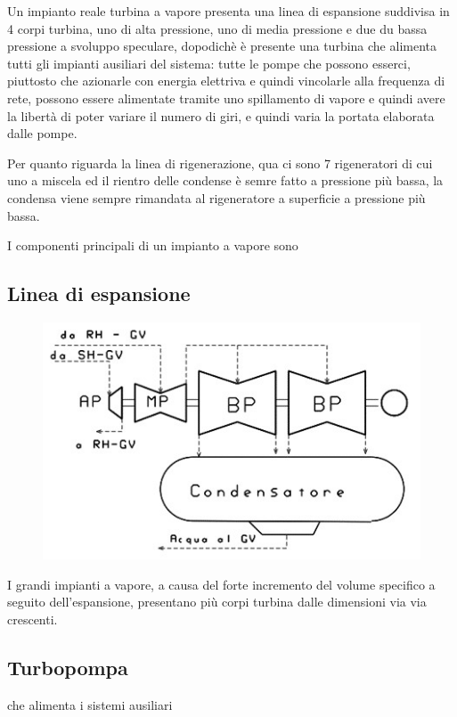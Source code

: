 \begin{adjustwidth}{2in}{}
	Un impianto reale turbina a vapore presenta una linea di espansione suddivisa in 4 corpi turbina, uno di alta pressione, uno di media pressione e due du bassa pressione a svoluppo speculare, dopodichè è presente una turbina che alimenta tutti gli impianti ausiliari del sistema: tutte le pompe che possono esserci, piuttosto che azionarle con energia elettriva e quindi vincolarle alla frequenza di rete, possono essere alimentate tramite uno spillamento di vapore e quindi avere la libertà di poter variare il numero di giri, e quindi varia la portata elaborata dalle pompe. 
	
	Per quanto riguarda la linea di rigenerazione, qua ci sono  7 rigeneratori di cui uno a miscela ed il rientro delle  condense è semre fatto a pressione più bassa, la condensa viene sempre rimandata al rigeneratore a superficie a pressione più bassa. 
	
	I componenti principali di un impianto a vapore sono

\subsection{Linea di espansione} 
		\begin{figure}[H]
			\centering
			\includegraphics[width=0.3\linewidth]{immagini/impiantovapore2}
			\label{fig:impiantovapore2}
		\end{figure}
		I grandi impianti a vapore, a causa del forte incremento del volume specifico a seguito dell'espansione, presentano più corpi turbina dalle dimensioni via via crescenti. 
\subsection{Turbopompa} che alimenta i sistemi ausiliari
\newpage

\end{adjustwidth}
